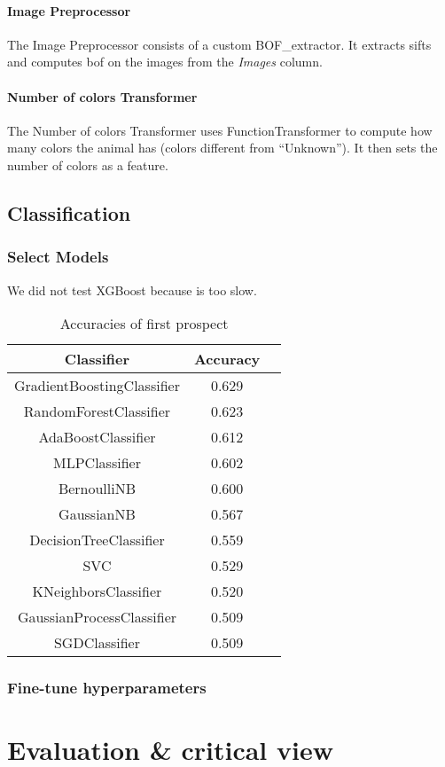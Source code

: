 \documentclass[12pt]{article}
\begin{document}
\paragraph{Image Preprocessor} The Image Preprocessor consists of a custom  BOF\_extractor. It extracts \glspl{sift} and computes \gls{bof} on the images from the \textit{Images} column.

\paragraph{Number of colors Transformer} The Number of colors Transformer uses FunctionTransformer to compute how many colors the animal has (\ie colors different from ``Unknown''). It then sets the number of colors as a feature.


\subsection{Classification}
\subsubsection{Select Models}
We did not test XGBoost because is too slow.

\begin{table}[ht]
    \centering
    \begin{tabular}{ccc}
        \toprule
        \textbf{Classifier}        & \textbf{Accuracy} \\ \midrule
        GradientBoostingClassifier & 0.629             \\
        RandomForestClassifier     & 0.623             \\
        AdaBoostClassifier         & 0.612             \\
        MLPClassifier              & 0.602             \\
        BernoulliNB                & 0.600             \\
        GaussianNB                 & 0.567             \\
        DecisionTreeClassifier     & 0.559             \\
        SVC                        & 0.529             \\
        KNeighborsClassifier       & 0.520             \\
        GaussianProcessClassifier  & 0.509             \\
        SGDClassifier              & 0.509             \\ \bottomrule
    \end{tabular}
    \caption{Accuracies of first prospect}
\end{table}

\subsubsection{Fine-tune hyperparameters}


\section{Evaluation \& critical view}

\clearpage

\printnoidxglossaries
\end{document}
